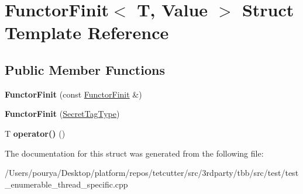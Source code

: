 \hypertarget{structFunctorFinit}{}\section{Functor\+Finit$<$ T, Value $>$ Struct Template Reference}
\label{structFunctorFinit}
\subsection*{Public Member Functions}
\begin{DoxyCompactItemize}
\item 
\hypertarget{structFunctorFinit_a4c493a9e632669223b895eaed27dcf73}{}{\bfseries Functor\+Finit} (const \hyperlink{structFunctorFinit}{Functor\+Finit} \&)\label{structFunctorFinit_a4c493a9e632669223b895eaed27dcf73}

\item 
\hypertarget{structFunctorFinit_a2b67aa37b09cff8032b379c5cefe3063}{}{\bfseries Functor\+Finit} (\hyperlink{structSecretTagType}{Secret\+Tag\+Type})\label{structFunctorFinit_a2b67aa37b09cff8032b379c5cefe3063}

\item 
\hypertarget{structFunctorFinit_abc34ad27e12f9d05478053589e1ed281}{}T {\bfseries operator()} ()\label{structFunctorFinit_abc34ad27e12f9d05478053589e1ed281}

\end{DoxyCompactItemize}


The documentation for this struct was generated from the following file\+:\begin{DoxyCompactItemize}
\item 
/\+Users/pourya/\+Desktop/platform/repos/tetcutter/src/3rdparty/tbb/src/test/test\+\_\+enumerable\+\_\+thread\+\_\+specific.\+cpp\end{DoxyCompactItemize}
